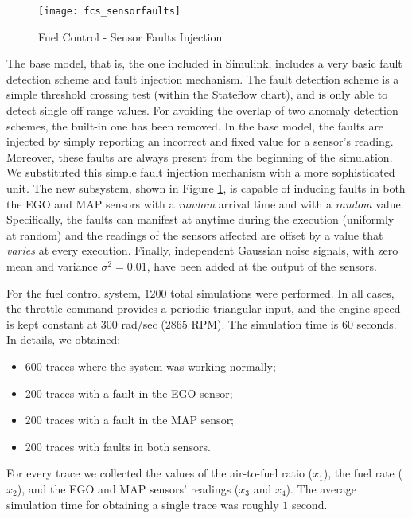 \begin{figure}
  \centering
  \texttt{[image: fcs\_sensorfaults]}
  \caption{Fuel Control - Sensor Faults Injection}\label{fig:fcs_sensorfaults}
\end{figure}

The base model, that is, the one included in Simulink, includes a very basic fault detection scheme and fault injection mechanism.
The fault detection scheme is a simple threshold crossing test (within the Stateflow chart), and is only able to detect single off range values. For avoiding the overlap of two anomaly detection schemes, the built-in one has been removed.
In the base model, the faults are injected by simply reporting an incorrect and fixed value for a sensor's reading. Moreover, these faults are always present from the beginning of the simulation. We substituted this simple fault injection mechanism with a more sophisticated unit.
The new subsystem, shown in Figure \ref{fig:fcs_sensorfaults}, is capable of inducing faults in both the EGO and MAP sensors with a \emph{random} arrival time and with a \emph{random} value.
Specifically, the faults can manifest at anytime during the execution (uniformly at random) and the readings of the sensors affected 
are offset by a value that \emph{varies} at every execution.
Finally, independent Gaussian noise signals, with zero mean and variance $\sigma^2 = 0.01$, have been added at the output of the sensors. 

For the fuel control system, $1200$ total simulations were performed.
In all cases, the throttle command provides a periodic triangular input, and the engine speed is kept constant at $300$ rad/sec ($2865$ RPM). The simulation time is $60$ seconds. In details, we obtained:
\begin{itemize}
\item 600 traces where the system was working normally;
\item 200 traces with a fault in the EGO sensor;
\item 200 traces with a fault in the MAP sensor;
\item 200 traces with faults in both sensors.
\end{itemize}
For every trace we collected the values of the air-to-fuel ratio ($x_1$), the fuel rate ($x_2$), and the EGO and MAP sensors' readings  ($x_3$ and $x_4$).
The average simulation time for obtaining a single trace was roughly $1$ second. 